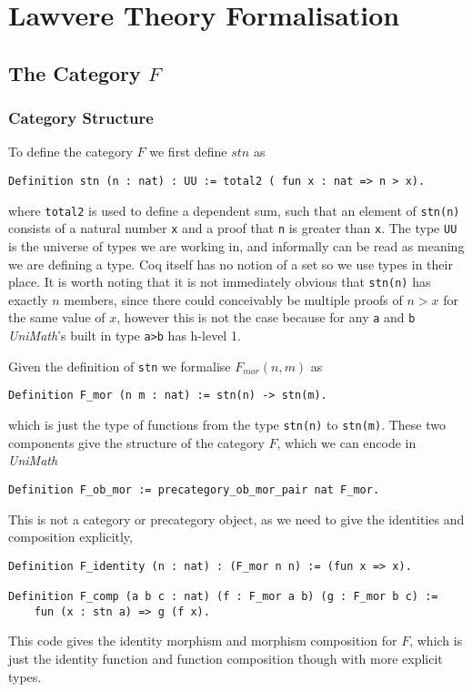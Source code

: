 \chapter{Lawvere Theory Formalisation}

\section{The Category $F$}
\subsection{Category Structure}
To define the category $F$ we first define $stn$ as
%
\begin{lstlisting}
Definition stn (n : nat) : UU := total2 ( fun x : nat => n > x).
\end{lstlisting}
%
where \lstinline|total2| is used to define a dependent sum, such that an element of
\lstinline|stn(n)| consists of a natural number \lstinline|x| and a proof that \lstinline|n| is
greater than \lstinline|x|. The type \lstinline|UU| is the universe of types we are
working in, and informally can be read as meaning we are defining a type. Coq
itself has no notion of a set so we use types in their place. It is worth
noting that it is not immediately obvious that \lstinline|stn(n)| has exactly $n$
members, since there could conceivably be multiple proofs of $n>x$ for the same
value of $x$, however this is not the case because for any \lstinline|a| and \lstinline|b|
\textit{UniMath}'s built in type \lstinline|a>b| has h-level 1.

Given the definition of \lstinline|stn| we formalise $F_{mor}(n,m)$ as
%
\begin{lstlisting}
Definition F_mor (n m : nat) := stn(n) -> stn(m).
\end{lstlisting}
%
which is just the type of functions from the type \lstinline|stn(n)| to
\lstinline|stn(m)|. These two components give the structure of the category $F$,
which we can encode in \textit{UniMath}
%
\begin{lstlisting}
Definition F_ob_mor := precategory_ob_mor_pair nat F_mor.
\end{lstlisting}

This is not a category or precategory object, as we need to give the identities
and composition explicitly,
%
\begin{lstlisting}
Definition F_identity (n : nat) : (F_mor n n) := (fun x => x).

Definition F_comp (a b c : nat) (f : F_mor a b) (g : F_mor b c) :=
    fun (x : stn a) => g (f x).
\end{lstlisting}
%
This code gives the identity morphism and morphism composition for $F$, which is
just the identity function and function composition though with more explicit
types.

